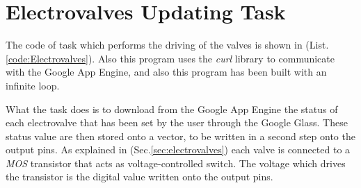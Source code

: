 \section{Electrovalves Updating Task}\label{sec:valves}

The code of task which performs the driving of the valves is shown in (List.\ref{code:Electrovalves}). Also this program uses the \textit{curl} library to communicate with the Google App Engine, and also this program has been built with an infinite loop.

What the task does is to download from the Google App Engine the status of each electrovalve that has been set by the user through the Google Glass. These status value are then stored onto a vector, to be written in a second step onto the output pins. As explained in (Sec.\ref{sec:electrovalves}) each valve is connected to a \textit{MOS} transistor that acts as voltage-controlled switch. The voltage which drives the transistor is the digital value written onto the output pins.
\cleardoublepage